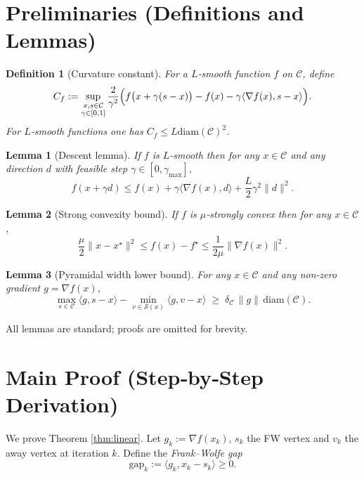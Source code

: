 \documentclass{article}
\newtheorem{lemma}{Lemma}
\newtheorem{definition}{Definition}
\newcommand{\C}{\mathcal{C}}
\newcommand{\gap}{\mathrm{gap}}
\newcommand{\diam}{\mathrm{diam}}
\begin{document}
\section*{Preliminaries (Definitions and Lemmas)}
\begin{definition}[Curvature constant]
For a $L$‑smooth function $f$ on $\C$, define
\[
C_{f}:=\sup_{\substack{x,s\in\C\\ \gamma\in[0,1]}}
\frac{2}{\gamma^{2}}\Bigl(f\bigl(x+\gamma(s-x)\bigr)-f(x)-\gamma\langle\nabla f(x),s-x\rangle\Bigr).
\]
For $L$‑smooth functions one has $C_{f}\le L\diam(\C)^{2}$.
\end{definition}
\begin{lemma}[Descent lemma]\label{lem:descent}
If $f$ is $L$‑smooth then for any $x\in\C$ and any direction $d$ with feasible step $\gamma\in[0,\gamma_{\max}]$,
\[
f(x+\gamma d)\le f(x)+\gamma\langle\nabla f(x),d\rangle+\frac{L}{2}\gamma^{2}\|d\|^{2}.
\]
\end{lemma}
\begin{lemma}[Strong convexity bound]\label{lem:strong}
If $f$ is $\mu$‑strongly convex then for any $x\in\C$,
\[
\frac{\mu}{2}\|x-x^{\star}\|^{2}\le f(x)-f^{\star}\le
\frac{1}{2\mu}\|\nabla f(x)\|^{2}.
\]
\end{lemma}
\begin{lemma}[Pyramidal width lower bound]\label{lem:pyramid}
For any $x\in\C$ and any non‑zero gradient $g=\nabla f(x)$,
\[
\max_{s\in\C}\langle g,s-x\rangle-\min_{v\in\mathcal{S}(x)}\langle g,v-x\rangle
\;\ge\; \delta_{\C}\,\|g\|\,\diam(\C).
\]
\end{lemma}
All lemmas are standard; proofs are omitted for brevity.

\section*{Main Proof (Step‑by‑Step Derivation)}
We prove Theorem \ref{thm:linear}.  
Let $g_{k}:=\nabla f(x_{k})$, $s_{k}$ the FW vertex and $v_{k}$ the away vertex at iteration $k$.
Define the \emph{Frank–Wolfe gap}
\[
\gap_{k}:=\langle g_{k},x_{k}-s_{k}\rangle\ge0.
\]
\end{document}
